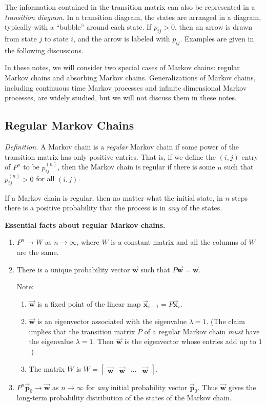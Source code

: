 \documentclass[reqno]{immbook}
\newcommand{\BP}{\vec{\textbf{p}}}
\newcommand{\BW}{\vec{\textbf{w}}}
\newcommand{\BX}{\vec{\textbf{x}}}
\numberwithin{equation}{chapter}
\numberwithin{question}{section}
\numberwithin{theorem}{chapter}
\numberwithin{figure}{chapter}
\theoremstyle{definition}
\begin{document}
The information contained in the transition matrix
can also be represented in a \emph{transition diagram}.
In a transition diagram, the states are arranged
in a diagram, typically with a ``bubble''
around each state.
If $p_{ij} > 0$, then an
arrow is drawn from state $j$ to state $i$, and the
arrow is labeled with $p_{ij}$.  Examples are given
in the following discussions.

In these notes, we will consider two special cases
of Markov chains: regular Markov chains and absorbing
Markov chains.
Generalizations of Markov chains, including
continuous time Markov processes and infinite
dimensional Markov processes, are widely studied,
but we will not discuss them in these notes.
%
%
\subsection*{Regular Markov Chains}

\noindent
\emph{Definition.} A Markov chain is a \emph{regular}
Markov chain if some power of the transition
matrix has only positive entries.
That is, if we define the $(i,j)$ entry of $P^n$
to be $p_{ij}^{(n)}$, then the Markov chain is
regular if there is some $n$ such that
$p_{ij}^{(n)}> 0$ for all $(i,j)$.

\medskip
If a Markov chain is regular, then no matter what the
initial state, in $n$ steps there is a positive
probability that the process is in \emph{any} of the states.

\noindent
\textbf{Essential facts about regular Markov chains.}
\begin{enumerate}
\item
$P^n\rightarrow W$ as $n\rightarrow\infty$, where
$W$ is a constant matrix and all the columns of
$W$ are the same.
\item There is a unique probability vector
$\BW$ such that $P\BW = \BW$.

Note:
\begin{enumerate}
\item $\BW$ is a fixed point of the linear map $\BX_{i+1} = P\BX_i$.
\item $\BW$ is an eigenvector associated with the eigenvalue $\lambda=1$.
(The claim implies that the transition matrix $P$ of a regular
Markov chain \emph{must} have the eigenvalue $\lambda=1$.
Then $\BW$ is the eigenvector whose entries add up to $1$.)
\item The matrix $W$ is $W = \begin{bmatrix} \BW & \BW & \cdots & \BW\end{bmatrix}$.
\end{enumerate}
\item $P^n\BP_0 \rightarrow \BW$ as $n\rightarrow\infty$ for \emph{any}
initial probability vector $\BP_0$.
Thus $\BW$ gives the long-term probability distribution of the
states of the Markov chain.
\end{enumerate}
\end{document}
